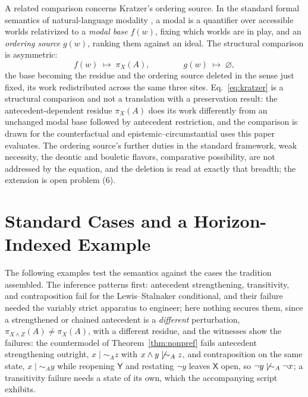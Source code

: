 A related comparison concerns Kratzer's ordering source. In the standard formal semantics of natural-language modality \parencite{kratzer2012modals, vonfintel2006}, a modal is a quantifier over accessible worlds relativized to a \emph{modal base} $f(w)$, fixing which worlds are in play, and an \emph{ordering source} $g(w)$, ranking them against an ideal. The structural comparison is asymmetric:
\begin{equation}\label{eq:kratzer}
f(w) \;\longmapsto\; \pi_X(A), \qquad\qquad g(w) \;\longmapsto\; \varnothing,
\end{equation}
the base becoming the residue and the ordering source deleted in the sense just fixed, its work redistributed across the same three sites. Eq.~\eqref{eq:kratzer} is a structural comparison and not a translation with a preservation result: the antecedent-dependent residue $\pi_X(A)$ does its work differently from an unchanged modal base followed by antecedent restriction, and the comparison is drawn for the counterfactual and epistemic--circumstantial uses this paper evaluates. The ordering source's further duties in the standard framework, weak necessity, the deontic and bouletic flavors, comparative possibility, are not addressed by the equation, and the deletion is read at exactly that breadth; the extension is open problem (6).

\section{Standard Cases and a Horizon-Indexed Example}%
\label{sec:battery}

The following examples test the semantics against the cases the tradition assembled. The inference patterns first: antecedent strengthening, transitivity, and contraposition fail for the Lewis--Stalnaker conditional, and their failure needed the variably strict apparatus to engineer; here nothing secures them, since a strengthened or chained antecedent is a \emph{different} perturbation, $\pi_{X \wedge Z}(A) \neq \pi_X(A)$, with a different residue, and the witnesses show the failures: the countermodel of Theorem~\ref{thm:nonpref} fails antecedent strengthening outright, $x \mid\sim_A z$ with $x \wedge y \not\mid\sim_A z$, and contraposition on the same state, $x \mid\sim_A y$ while reopening $\mathsf{Y}$ and restating $\neg y$ leaves $\mathsf{X}$ open, so $\neg y \not\mid\sim_A \neg x$; a transitivity failure needs a state of its own, which the accompanying script exhibits.

